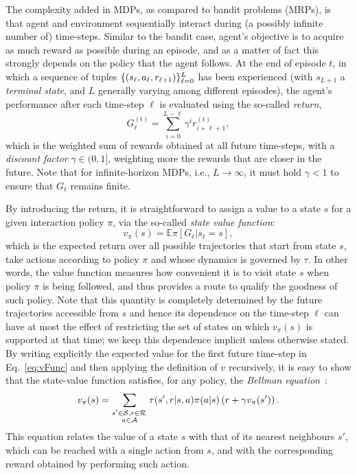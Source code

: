 The complexity added in MDPs, as compared to bandit problems (MRPs), is that agent and environment sequentially interact during (a possibly infinite number of) time-steps. Similar to the bandit case, agent's objective is to acquire as much reward as possible during an episode, and as a matter of fact this strongly depends on the policy that the agent follows. At the end of episode $t$, in which a sequence of tuples %
$\lbrace (s_\ell, a_\ell, r_{\ell+1})\rbrace_{\ell = 0}^{L}$ has been experienced (with $s_{L+1}$ a \textit{terminal state}, and $L$ generally varying among different episodes), the agent's performance after each time-step $\ell$ is evaluated using the so-called \textit{return},
\begin{equation} \label{eq:returnGT}
G_{\ell}^{(t)}=\sum_{i=0}^{L-\ell}\gamma^i r_{i+\ell+1}^{(t)},
\end{equation}
which is the weighted sum of rewards obtained at all future time-steps, with a \textit{discount factor} $\gamma\in(0,1]$, weighting more the rewards that are closer in the future. Note that for infinite-horizon MDPs, i.e., $L\rightarrow\infty$, it must hold $\gamma<1$ to ensure that $G_\ell$ remains finite.

By introducing the return, it is straightforward to assign a value to a state $s$ for a given interaction policy $\pi$, via the so-called \textit{state value function}:
\begin{equation}\label{eq:vFunc}
v_\pi(s)=\mathbb{E}{\pi}[{G_\ell | s_\ell=s}],
\end{equation}
which is the expected return over all possible trajectories that start from state $s$, take actions according to policy $\pi$ and whose dynamics is governed by $\tau$. In other words, the value function measures how convenient it is to visit state $s$ when policy $\pi$ is being followed, and thus provides a route to qualify the goodness of such policy. Note that this quantity is completely determined by the future trajectories accessible from $s$ and hence its dependence on the time-step $\ell$ can have at most the effect of restricting the set of states on which $v_{\pi}(s)$ is supported at that time; we keep this dependence implicit unless otherwise stated. By writing explicitly the expected value for the first future time-step in Eq.~\eqref{eq:vFunc} and then applying the definition of $v$ recursively, it is easy to show that the state-value function satisfies, for any policy, the \textit{Bellman equation}~\cite{Bellman2003}:
\begin{equation}\label{eq:vBell}
v_\pi(s) = \sum_{\substack{ s'\in\mathcal{S}, r\in\mathcal{R}\,\\ a\in\mathcal{A}}}\tau(s',r|s,a)\pi(a|s)\left(r+\gamma v_\pi(s')\right).
\end{equation}
This equation relates the value of a state $s$ with that of its nearest neighbours $s'$, which can be reached with a single action from $s$, and with the corresponding reward obtained by performing such action.

